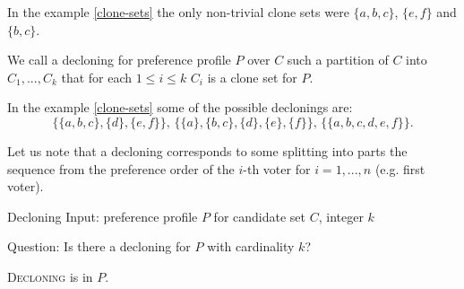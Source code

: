 \begin{exmp}
In the example \ref{clone-sets} the only non-trivial clone sets were
$\{a,b,c\}$, $\{e,f\}$ and $\{b,c\}$.
\end{exmp}

\begin{defn}[decloning]
We call a decloning for preference profile $P$ over $C$
such a partition of $C$  into $C_1, ... , C_k$
that for each $1 \leq i \leq k$ $C_i$ is a clone set for $P$.
\end{defn}

\begin{exmp}
In the example \ref{clone-sets} some of the possible declonings are:
$$
\big\{ \{a,b,c\}, \{d\}, \{e,f\} \big\} \text{, }
\big\{ \{a\}, \{b,c\}, \{d\}, \{e\}, \{f\} \big\} \text{, }
\big\{ \{a,b,c,d,e,f\} \big\} \text{.}
$$
\end{exmp}

\begin{rmrk} \label{sequence-split}
Let us note that a decloning corresponds to some splitting into parts
the sequence from the preference order of the $i$-th voter for $i=1,...,n$ (e.g. first voter).
\end{rmrk}


\begin{problem}{Decloning}
    Input: preference profile $P$ for candidate set $C$, integer $k$

    Question: Is there a decloning for $P$ with cardinality $k$?
\end{problem}


\begin{thm}
\textsc{Decloning} is in $P$.
\end{thm}


